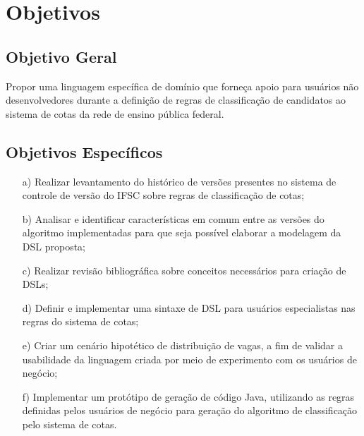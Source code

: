 \section{Objetivos}
\label{objetivos}

\subsection{Objetivo Geral}
\label{objetivogeral}

Propor uma linguagem específica de domínio que forneça apoio para usuários não desenvolvedores durante a definição de regras de classificação de candidatos ao sistema de cotas da rede de ensino pública federal.

\subsection{Objetivos Específicos}
\label{objetivosespecificos}

\begin{enumerate}
    \item[a)] Realizar levantamento do histórico de versões presentes no sistema de controle de versão do \gls{IFSC} sobre regras de classificação de cotas;
    \item[b)] Analisar e identificar características em comum entre as versões do algoritmo implementadas para que seja possível elaborar a modelagem da \gls{DSL} proposta;
    \item[c)] Realizar revisão bibliográfica sobre conceitos necessários para criação de \gls{DSL}s;
    \item[d)] Definir e implementar uma sintaxe de \gls{DSL} para usuários especialistas nas regras do sistema de cotas;
    \item[e)] Criar um cenário hipotético de distribuição de vagas, a fim de validar a usabilidade da linguagem criada por meio de experimento com os usuários de negócio;
    \item[f)] Implementar um protótipo de geração de código Java, utilizando as regras definidas pelos usuários de negócio para geração do algoritmo de classificação pelo sistema de cotas.
\end{enumerate}{}
